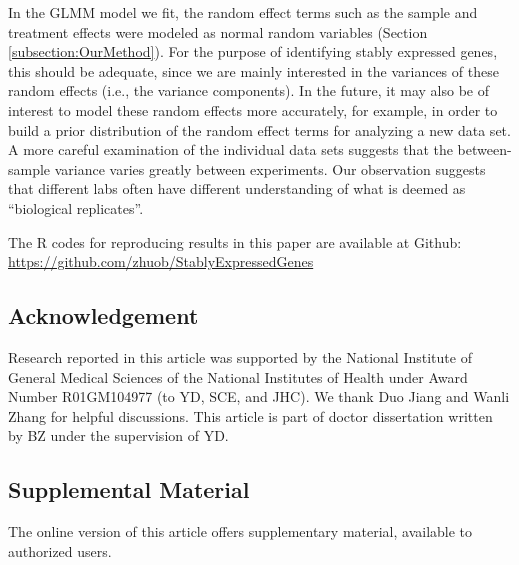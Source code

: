 			
			In the GLMM model we fit, the random effect terms such as the sample and treatment
			effects were modeled as normal random variables (Section
			\ref{subsection:OurMethod}). For the purpose of identifying stably
			expressed genes, this should be adequate, since we are mainly interested in
			the variances of these random effects (i.e., the variance components). In the
			future, it may also be of interest to model these random effects more
			accurately, for example, in order to build a prior distribution of the random
			effect terms for analyzing a new data set. A more careful examination of the
			individual data sets suggests that the between-sample variance varies greatly
			between experiments. Our observation suggests that different labs often have
			different understanding of what is deemed as ``biological replicates''.
			
			The R codes for reproducing results in this paper are available at Github:
			\url{https://github.com/zhuob/StablyExpressedGenes}
			
			\subsection*{Acknowledgement}	
			 Research reported in this article was supported by the National Institute of 
			 General Medical Sciences of the National Institutes of Health under Award Number 
			 R01GM104977 (to YD, SCE, and JHC). We thank Duo Jiang and Wanli Zhang for helpful 
			 discussions. This article is part of doctor dissertation written by BZ under the 
			 supervision of YD. 
			
			\subsection*{Supplemental Material}The online version of this article offers 
			supplementary material,
			available to authorized users.
			
			
			\newpage
